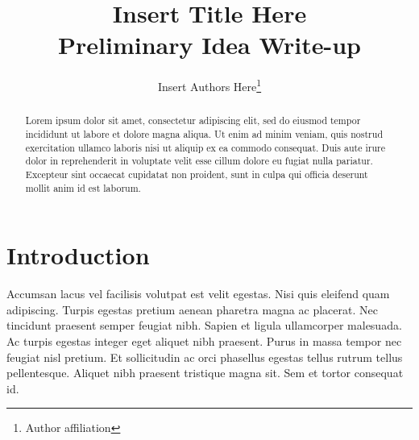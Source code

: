 \documentclass[12pt]{article}
\begin{document}
\title{
Insert Title Here
\\{\color{blue} \large Preliminary Idea Write-up}
}

\author{
Insert Authors Here\footnote{Author affiliation}
}
\begin{titlepage}
% 
\maketitle


\doublespacing
\begin{abstract}
Lorem ipsum dolor sit amet, consectetur adipiscing elit, sed do eiusmod tempor
incididunt ut labore et dolore magna aliqua. Ut enim ad minim veniam, quis
nostrud exercitation ullamco laboris nisi ut aliquip ex ea commodo consequat.
Duis aute irure dolor in reprehenderit in voluptate velit esse cillum dolore
eu fugiat nulla pariatur. Excepteur sint occaecat cupidatat non proident,
sunt in culpa qui officia deserunt mollit anim id est laborum.
\end{abstract}


\end{titlepage}

\doublespacing
\section{Introduction}

Accumsan lacus vel facilisis volutpat est velit egestas. Nisi quis eleifend
quam adipiscing. Turpis egestas pretium aenean pharetra magna ac placerat.
Nec tincidunt praesent semper feugiat nibh. Sapien et ligula ullamcorper
malesuada. Ac turpis egestas integer eget aliquet nibh praesent. Purus in
massa tempor nec feugiat nisl pretium. Et sollicitudin ac orci phasellus
egestas tellus rutrum tellus pellentesque. Aliquet nibh praesent tristique
magna sit. Sem et tortor consequat id.
\end{document}
